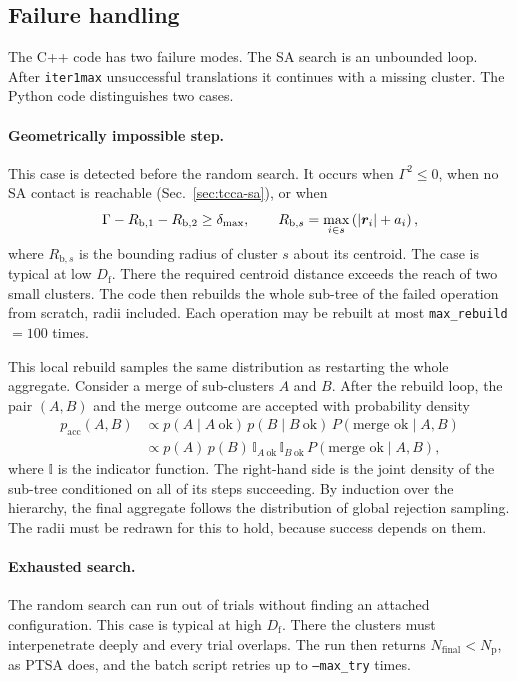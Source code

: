 \documentclass[11pt,a4paper]{article}
\newcommand{\Df}{D_\text{f}}
\newcommand{\dmax}{\delta_\text{max}}
\begin{document}
\subsection{Failure handling}
\label{sec:tcca-failure}

The C++ code has two failure modes.
The SA search is an unbounded loop.
After \texttt{iter1max} unsuccessful translations it continues with a missing cluster.
The Python code distinguishes two cases.

\paragraph{Geometrically impossible step.}
This case is detected before the random search.
It occurs when $\Gamma^2 \le 0$, when no SA contact is reachable (Sec.~\ref{sec:tcca-sa}), or when
\begin{equation}
  \Gamma - R_{\text{b},1} - R_{\text{b},2} \ge \dmax , \qquad
  R_{\text{b},s} = \max_{i \in s} \left( \abs{\bm{r}_i} + a_i \right) ,
  \label{eq:reach}
\end{equation}
where $R_{\text{b},s}$ is the bounding radius of cluster $s$ about its centroid.
The case is typical at low $\Df$.
There the required centroid distance exceeds the reach of two small clusters.
The code then rebuilds the whole sub-tree of the failed operation from scratch, radii included.
Each operation may be rebuilt at most \texttt{max\_rebuild} $= 100$ times.

This local rebuild samples the same distribution as restarting the whole aggregate.
Consider a merge of sub-clusters $A$ and $B$.
After the rebuild loop, the pair $(A, B)$ and the merge outcome are accepted with probability density
\begin{align}
  p_\text{acc}(A, B)
  &\propto p(A \mid A\ \text{ok})\, p(B \mid B\ \text{ok})\, P(\text{merge ok} \mid A, B) \nonumber \\
  &\propto p(A)\, p(B)\, \mathbb{I}_{A\ \text{ok}}\, \mathbb{I}_{B\ \text{ok}}\, P(\text{merge ok} \mid A, B) ,
  \label{eq:rejection}
\end{align}
where $\mathbb{I}$ is the indicator function.
The right-hand side is the joint density of the sub-tree conditioned on all of its steps succeeding.
By induction over the hierarchy, the final aggregate follows the distribution of global rejection sampling.
The radii must be redrawn for this to hold, because success depends on them.

\paragraph{Exhausted search.}
The random search can run out of trials without finding an attached configuration.
This case is typical at high $\Df$.
There the clusters must interpenetrate deeply and every trial overlaps.
The run then returns $N_\text{final} < N_\text{p}$, as PTSA does, and the batch script retries up to \texttt{--max\_try} times.
\end{document}
